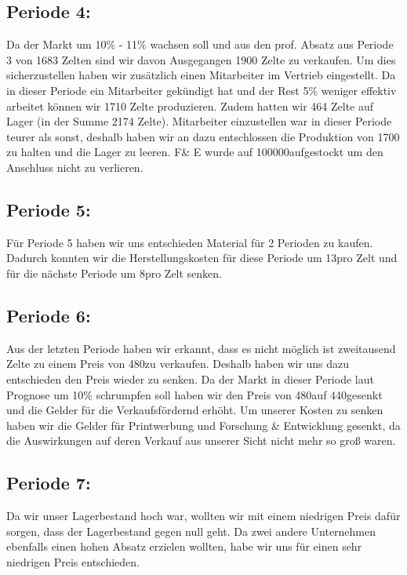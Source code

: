 \documentclass[12pt]{article}
\begin{document}
\subsection{Periode 4:}
Da der Markt um 10\% - 11\% wachsen soll und aus den prof. Absatz aus Periode 3 von 1683 Zelten sind wir davon Ausgegangen 1900 Zelte zu verkaufen.
Um dies sicherzustellen haben wir zusätzlich einen Mitarbeiter im Vertrieb eingestellt.
Da in dieser Periode ein Mitarbeiter gekündigt hat und der Rest 5\% weniger effektiv arbeitet können wir  1710 Zelte produzieren.
Zudem hatten wir 464 Zelte auf Lager (in der Summe 2174 Zelte).
Mitarbeiter einzustellen war in dieser Periode teurer als sonst,
deshalb haben wir an dazu entschlossen die Produktion von 1700 zu halten und die Lager zu leeren.
F\& E wurde auf 100000\texteuro aufgestockt um den Anschluss nicht zu verlieren.  

\subsection{Periode 5:}
Für Periode 5 haben wir uns entschieden Material für 2 Perioden zu kaufen.
Dadurch konnten wir die Herstellungskosten für diese Periode um 13\texteuro pro Zelt und für die nächste Periode um 8\texteuro pro Zelt senken.

\subsection{Periode 6:}
Aus der letzten Periode haben wir erkannt, dass es nicht möglich ist zweitausend Zelte zu einem Preis von 480\texteuro zu verkaufen.
Deshalb haben wir uns dazu entschieden den Preis wieder zu senken.
Da der Markt in dieser Periode laut Prognose um 10\% schrumpfen soll haben wir den Preis von 480\texteuro auf 440\texteuro gesenkt und die Gelder für die Verkaufsfördernd erhöht.
Um unserer Kosten zu senken haben wir die Gelder für Printwerbung und Forschung \& Entwicklung gesenkt, da die Auswirkungen auf deren Verkauf aus unserer Sicht nicht mehr so groß waren.


\subsection{Periode 7:}
Da wir unser Lagerbestand hoch war, wollten wir mit einem niedrigen Preis dafür sorgen,
dass der Lagerbestand gegen null geht.
Da zwei andere Unternehmen ebenfalls einen hohen Absatz erzielen wollten, habe wir uns für einen sehr niedrigen Preis entschieden.
\end{document}

